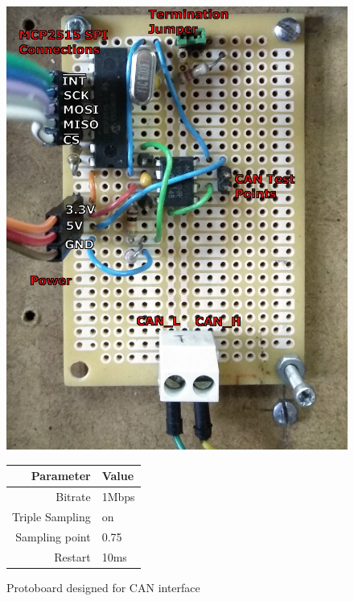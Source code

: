 \begin{figure}[hb]
	\begin{minipage}{0.49\linewidth}
		\centering
		\includegraphics[width=1\linewidth]{figures/proto_can}
		\caption{Protoboard designed for CAN interface}
		\label{fig:proto_can}
	\end{minipage}
	\begin{minipage}{0.49\linewidth}
		\centering
		\begin{tabular}{rl}
			\toprule
			\textbf{Parameter} & \textbf{Value}\\
			\midrule
			Bitrate & 1Mbps\\
			Triple Sampling & on\\
			Sampling point & 0.75\\
			Restart & 10ms\\
			\bottomrule
		\end{tabular}
	    \label{tab:can_settings}
	\end{minipage}
\end{figure}

